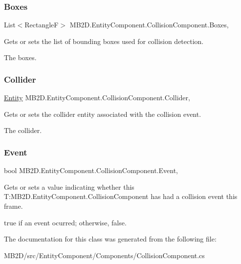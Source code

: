 \subsubsection{\texorpdfstring{Boxes}{Boxes}}
{\footnotesize\ttfamily List$<$RectangleF$>$ M\+B2\+D.\+Entity\+Component.\+Collision\+Component.\+Boxes\hspace{0.3cm}{\ttfamily [get]}, {\ttfamily [set]}}



Gets or sets the list of bounding boxes used for collision detection. 

The boxes.\hypertarget{class_m_b2_d_1_1_entity_component_1_1_collision_component_aac8e61b6e669a4451fb2e8859827b47a}{}\label{class_m_b2_d_1_1_entity_component_1_1_collision_component_aac8e61b6e669a4451fb2e8859827b47a} 
\subsubsection{\texorpdfstring{Collider}{Collider}}
{\footnotesize\ttfamily \hyperlink{class_m_b2_d_1_1_entity_component_1_1_entity}{Entity} M\+B2\+D.\+Entity\+Component.\+Collision\+Component.\+Collider\hspace{0.3cm}{\ttfamily [get]}, {\ttfamily [set]}}



Gets or sets the collider entity associated with the collision event. 

The collider.\hypertarget{class_m_b2_d_1_1_entity_component_1_1_collision_component_ad393ea9f0115ee346e469e5c335da26d}{}\label{class_m_b2_d_1_1_entity_component_1_1_collision_component_ad393ea9f0115ee346e469e5c335da26d} 
\subsubsection{\texorpdfstring{Event}{Event}}
{\footnotesize\ttfamily bool M\+B2\+D.\+Entity\+Component.\+Collision\+Component.\+Event\hspace{0.3cm}{\ttfamily [get]}, {\ttfamily [set]}}



Gets or sets a value indicating whether this T\+:\+M\+B2\+D.\+Entity\+Component.\+Collision\+Component has had a collision event this frame. 

{\ttfamily true} if an event ocurred; otherwise, {\ttfamily false}.

The documentation for this class was generated from the following file\+:\begin{DoxyCompactItemize}
\item 
M\+B2\+D/src/\+Entity\+Component/\+Components/Collision\+Component.\+cs\end{DoxyCompactItemize}
